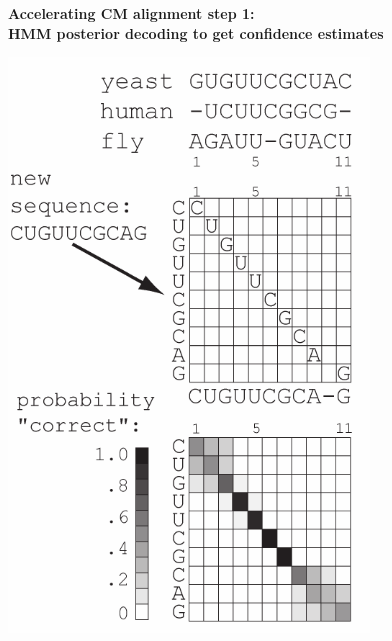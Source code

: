 \documentclass[landscape]{slides}
\begin{document}
\begin{slide}
\begin{center}

\textbf{Accelerating CM alignment step 1: \\ HMM posterior decoding to
  get confidence estimates}

\includegraphics[height=6in]{figs/hmm_alignment2_layer3}
\end{center}

\vfill
\end{slide}
\end{document}
